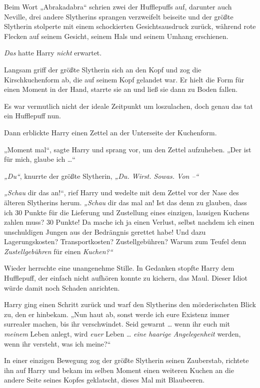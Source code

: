 Beim Wort „Abrakadabra“ schrien zwei der Hufflepuffs auf, darunter auch Neville, drei andere Slytherins sprangen verzweifelt beiseite und der größte Slytherin stolperte mit einem schockierten Gesichtsausdruck zurück, während rote Flecken auf seinem Gesicht, seinem Hals und seinem Umhang erschienen. 

\emph{Das} hatte Harry \emph{nicht} erwartet. 

Langsam griff der größte Slytherin sich an den Kopf und zog die Kirschkuchenform ab, die auf seinem Kopf gelandet war. Er hielt die Form für einen Moment in der Hand, starrte sie an und ließ sie dann zu Boden fallen. 

Es war vermutlich nicht der ideale Zeitpunkt um loszulachen, doch genau das tat ein Hufflepuff nun. 

Dann erblickte Harry einen Zettel an der Unterseite der Kuchenform. 

„Moment mal“, sagte Harry und sprang vor, um den Zettel aufzuheben. „Der ist für mich, glaube ich …“ 

\emph{„Du“}, knurrte der größte Slytherin, \emph{„Du. Wirst. Sowas. Von –“} 

\emph{„Schau} dir das an!“, rief Harry und wedelte mit dem Zettel vor der Nase des älteren Slytherins herum. \emph{„Schau} dir das mal an! Ist das denn zu glauben, dass ich 30 Punkte für die Lieferung und Zustellung eines einzigen, lausigen Kuchens zahlen muss? 30 Punkte! Da mache ich ja einen Verlust, selbst nachdem ich einen unschuldigen Jungen aus der Bedrängnis gerettet habe! Und dazu Lagerungskosten? Transportkosten? Zustellgebühren? Warum zum Teufel denn \emph{Zustellgebühren} für einen \emph{Kuchen?“} 

Wieder herrschte eine unangenehme Stille. In Gedanken stopfte Harry dem Hufflepuff, der einfach nicht aufhören konnte zu kichern, das Maul. Dieser Idiot würde damit noch Schaden anrichten. 

Harry ging einen Schritt zurück und warf den Slytherins den mörderischsten Blick zu, den er hinbekam. „Nun haut ab, sonst werde ich eure Existenz immer surrealer machen, bis ihr verschwindet. Seid gewarnt … wenn ihr euch mit \emph{meinem} Leben anlegt, wird \emph{euer} Leben … \emph{eine haarige Angelegenheit} werden, wenn ihr versteht, was ich meine?“ 

In einer einzigen Bewegung zog der größte Slytherin seinen Zauberstab, richtete ihn auf Harry und bekam im selben Moment einen weiteren Kuchen an die andere Seite seines Kopfes geklatscht, dieses Mal mit Blaubeeren. 

